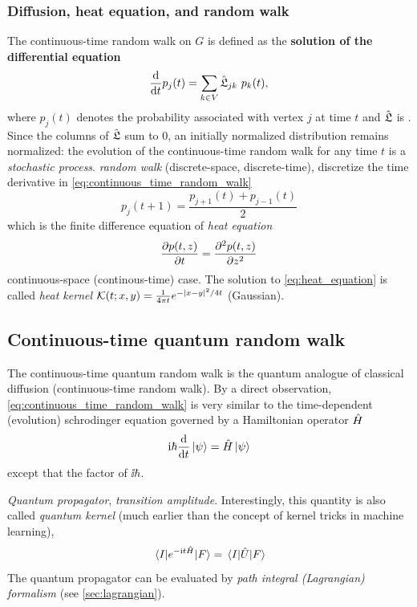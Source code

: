 \subsubsection{Diffusion, heat equation, and random walk}
The continuous-time random walk on $G$ is defined as the \textbf{solution of the differential equation}
\begin{equation}
	\dv{t} p_j(t)
	=
	\sum_{k\in V} \hat{\mathfrak{L}}_{jk} \ p_k(t),
	\label{eq:continuous_time_random_walk}
\end{equation}
where $p_j(t)$ denotes the probability associated with vertex $j$ at time $t$
and $\hat{\mathfrak{L}}$ is .
Since the columns of $\hat{\mathfrak{L}}$ sum to 0,
an initially normalized distribution remains normalized:
the evolution of the continuous-time random walk for any time $t$ is a \emph{stochastic process}.
\emph{random walk} (discrete-space, discrete-time), 
discretize the time derivative in \cref{eq:continuous_time_random_walk}
\begin{equation}
	p_j(t+1) = \frac{p_{j+1}(t) + p_{j-1}(t)}{2} 
\end{equation}
which is the finite difference equation of \emph{heat equation} 
\begin{equation}
	\pdv{p(t,z)}{t} = \pdv{ ^2 p(t,z)}{z^2}
	\label{eq:heat_equation}
\end{equation}
continuous-space (continous-time) case.
The solution to \cref{eq:heat_equation} is called \emph{heat kernel} $\mathcal{K}(t;x,y)=\frac{1}{4\pi t} e^{-\abs{x-y}^2/4t}$ (Gaussian).

\subsection{Continuous-time quantum random walk}\label{sec:ct_quantum_walk}
The continuous-time quantum random walk \cite{childsExampleDifferenceQuantum2002} is the quantum analogue of classical diffusion (continuous-time random walk).
By a direct observation, \cref{eq:continuous_time_random_walk} is very similar to the time-dependent (evolution) schrodinger equation governed by a Hamiltonian operator $\hat{H}$
\begin{equation}
	\textup{i}\hbar \dv{t} \ket{\psi} = \hat{H} \ket{\psi}
	\label{eq:evolution}
\end{equation}
except that the factor of $\ii\hbar$.
\begin{definition}\label{def:quantum_propagator}
	\emph{Quantum propagator}, \emph{transition amplitude}.
	Interestingly, this quantity is also called \emph{quantum kernel} (much earlier than the concept of kernel tricks in machine learning), 
	\begin{equation}
		\mel{I}{e^{-\textup{i}t \hat{H}}}{F}
		=
		\mel{I}{\hat{U}}{F}
	\end{equation}
	The quantum propagator can be evaluated by \emph{path integral (Lagrangian) formalism} (see \cref{sec:lagrangian}).
\end{definition}

